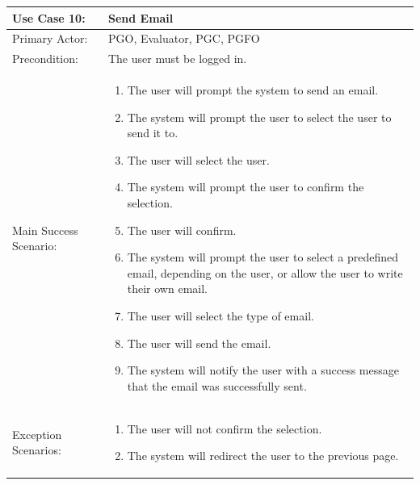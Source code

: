 \documentclass{article}
\begin{document}
\begin{tabular} {| m{5cm} | m{10cm} |}
\hline
Use Case 10: & Send Email \\
\hline
Primary Actor: & PGO, Evaluator, PGC, PGFO \\
\hline
Precondition: & The user must be logged in. \\
\hline
Main Success Scenario: & \begin{enumerate} \itemsep0em \item The user will prompt the system to send an email.
\item The system will prompt the user to select the user to send it to.
\item The user will select the user.
\item The system will prompt the user to confirm the selection.
\item The user will confirm.
\item The system will prompt the user to select a predefined email, depending on the user, or allow the user to write their own email.
\item The user will select the type of email.
\item The user will send the email.
\item The system will notify the user with a success message that the email was successfully sent.
\end{enumerate}\\
\hline
Exception Scenarios: & \begin{enumerate} \itemsep0em \item  The user will not confirm the selection.
\item The system will redirect the user to the previous page.
\end{enumerate} \\
\hline
\end{tabular}
\\ \\ \\ \\
\end{document}
